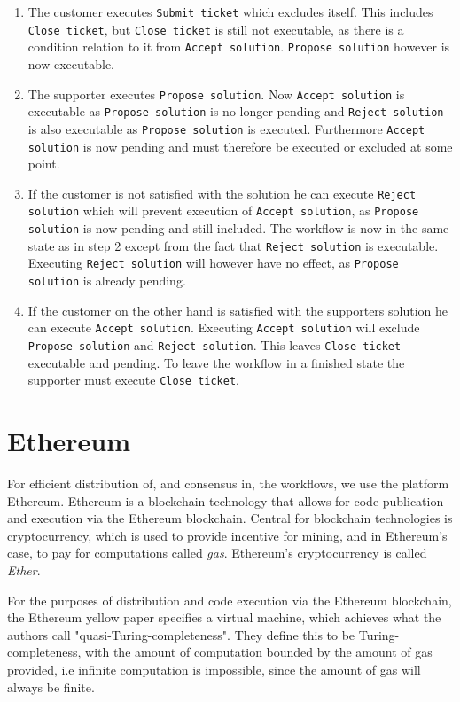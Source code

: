 \documentclass{article}
\begin{document}
	\begin{enumerate}
		\item The customer executes \texttt{Submit ticket} which excludes itself. 
		This includes \texttt{Close ticket}, but \texttt{Close ticket} is still not executable, as there is a condition relation to it from \texttt{Accept solution}.
		\texttt{Propose solution} however is now executable.
		\item The supporter executes \texttt{Propose solution}. Now \texttt{Accept solution} is executable as \texttt{Propose solution} is no longer pending and \texttt{Reject solution} is also executable as \texttt{Propose solution} is executed. 
		Furthermore \texttt{Accept solution} is now pending and must therefore be executed or excluded at some point.
		\item If the customer is not satisfied with the solution he can execute \texttt{Reject solution} which will prevent execution of \texttt{Accept solution}, as \texttt{Propose solution} is now pending and still included. 
		The workflow is now in the same state as in step 2 except from the fact that \texttt{Reject solution} is executable. 
		Executing \texttt{Reject solution} will however have no effect, as \texttt{Propose solution} is already pending.
		\item If the customer on the other hand is satisfied with the supporters solution he can execute \texttt{Accept solution}.
		Executing \texttt{Accept solution} will exclude \texttt{Propose solution} and \texttt{Reject solution}.
		This leaves \texttt{Close ticket} executable and pending.
		To leave the workflow in a finished state the supporter must execute \texttt{Close ticket}. 
	\end{enumerate}

	\section{Ethereum}
		For efficient distribution of, and consensus in, the workflows, we use the platform Ethereum. 
		Ethereum is a blockchain technology that allows for code publication and execution via the Ethereum blockchain.  
		Central for blockchain technologies is cryptocurrency, which is used to provide incentive for mining, and in Ethereum's case, to pay for computations called \textit{gas}\cite{yellow-paper}.
		Ethereum's cryptocurrency is called \textit{Ether}\cite{yellow-paper}.

		For the purposes of distribution and code execution via the Ethereum blockchain, the Ethereum yellow paper specifies a virtual machine, which achieves what the authors call "quasi-Turing-completeness"\cite{yellow-paper}. 
		They define this to be Turing-completeness, with the amount of computation bounded by the amount of gas provided,
		i.e infinite computation is impossible, since the amount of gas will always be finite. 
\end{document}
